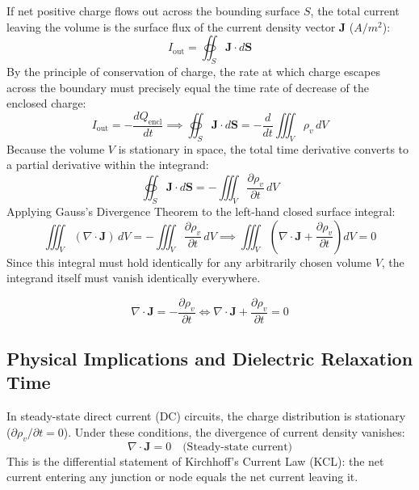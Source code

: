If net positive charge flows out across the bounding surface $S$, the total current leaving the volume is the surface flux of the current density vector $\mathbf{J}$ ($\si{A/m^2}$):
\begin{equation}
    I_{\text{out}} = \oiint_S \mathbf{J} \cdot d\mathbf{S}
\end{equation}
By the principle of conservation of charge, the rate at which charge escapes across the boundary must precisely equal the time rate of decrease of the enclosed charge:
\begin{equation}
    I_{\text{out}} = -\frac{dQ_{\text{encl}}}{dt} \implies \oiint_S \mathbf{J} \cdot d\mathbf{S} = -\frac{d}{dt} \iiint_V \rho_v\, dV
\end{equation}
Because the volume $V$ is stationary in space, the total time derivative converts to a partial derivative within the integrand:
\begin{equation}
    \oiint_S \mathbf{J} \cdot d\mathbf{S} = -\iiint_V \frac{\partial \rho_v}{\partial t}\, dV
\end{equation}
Applying Gauss's Divergence Theorem to the left-hand closed surface integral:
\begin{equation}
    \iiint_V (\nabla \cdot \mathbf{J})\, dV = -\iiint_V \frac{\partial \rho_v}{\partial t}\, dV \implies \iiint_V \left( \nabla \cdot \mathbf{J} + \frac{\partial \rho_v}{\partial t} \right) dV = 0
\end{equation}
Since this integral must hold identically for any arbitrarily chosen volume $V$, the integrand itself must vanish identically everywhere.

\begin{keyequation}
\begin{equation}
    \nabla \cdot \mathbf{J} = -\frac{\partial \rho_v}{\partial t} \iff \nabla \cdot \mathbf{J} + \frac{\partial \rho_v}{\partial t} = 0
\end{equation}
\end{keyequation}

\subsection{Physical Implications and Dielectric Relaxation Time}
In steady-state direct current (DC) circuits, the charge distribution is stationary ($\partial \rho_v / \partial t = 0$). Under these conditions, the divergence of current density vanishes:
\begin{equation}
    \nabla \cdot \mathbf{J} = 0 \quad \text{(Steady-state current)}
\end{equation}
This is the differential statement of Kirchhoff's Current Law (KCL): the net current entering any junction or node equals the net current leaving it.

